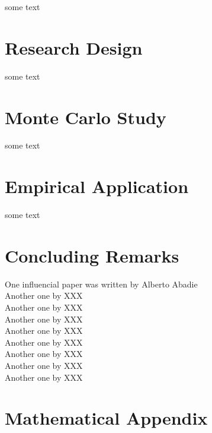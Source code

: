\documentclass[AER]{AEA}
\begin{document}
	some text
	
	\section{Research Design}
	
	some text
	
	\section{Monte Carlo Study}
	
	some text
	
	\section{Empirical Application}
	
	some text
		
	\section{Concluding Remarks}
	
	One influencial paper was written by Alberto Abadie \cite{abadie:2021a} \\
	Another one by XXX \cite{abadie:2007} \\
	Another one by XXX \cite{abadie:2011} \\
	Another one by XXX \cite{abadie:2003} \\
	Another one by XXX \cite{abadie:2021b} \\
	Another one by XXX \cite{amjad:2018} \\
	Another one by XXX \cite{athey:2021} \\
	Another one by XXX \cite{athey:2017} \\
	Another one by XXX \cite{athey:2016} \\
	
	\newpage
	
	
	
	\appendix
	
	\section{Mathematical Appendix}
	
\end{document}
